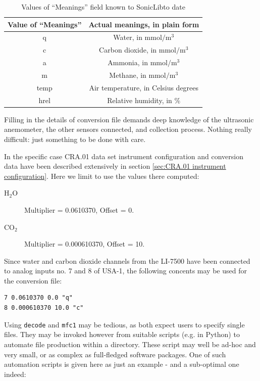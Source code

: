 \documentclass[a4paper,10pt]{book}
\begin{document}
\begin{table}
 \begin{tabular}{cc}
  \hline
  Value of ``Meanings'' & Actual meanings, in plain form \\
  \hline
           q            & Water, in $\mbox{mmol}/\mbox{m}^3$ \\
           c            & Carbon dioxide, in $\mbox{mmol}/\mbox{m}^3$ \\
           a            & Ammonia, in $\mbox{mmol}/\mbox{m}^3$ \\
           m            & Methane, in $\mbox{mmol}/\mbox{m}^3$ \\
           temp         & Air temperature, in Celsius degrees \\
           hrel         & Relative humidity, in \% \\
  \hline
 \end{tabular} 
\caption{Values of ``Meanings'' field known to SonicLibto date}
\label{tab:Meanings values in conversion}
\end{table} 

Filling in the details of conversion file demands deep knowledge of the ultrasonic anemometer, the other sensors connected, and collection process. Nothing really difficult: just something to be done with care.

In the specific case CRA.01 data set instrument configuration and conversion data have been described extensively in section \ref{sec:CRA.01 instrument configuration}. Here we limit to use the values there computed:

\begin{description}
 \item[$\mbox{H}_{2}\mbox{O}$] Multiplier = 0.0610370, Offset = 0.
 \item[$\mbox{C}\mbox{O}_{2}$] Multiplier = 0.000610370, Offset = 10.
\end{description} 

Since water and carbon dioxide channels from the LI-7500 have been connected to analog inputs no. 7 and 8 of USA-1, the following concents may be used for the conversion file:

\begin{verbatim}
7 0.0610370 0.0 "q"
8 0.000610370 10.0 "c"
\end{verbatim}

Using \verb|decode| and \verb|mfc1| may be tedious, as both expect users to specify single files. They may be invoked however from suitable scripts (e.g. in Python) to automate file production within a directory. These script may well be ad-hoc and very small, or as complex as full-fledged software packages. One of such automation scripts is given here as just an example - and a sub-optimal one indeed:
\end{document}
